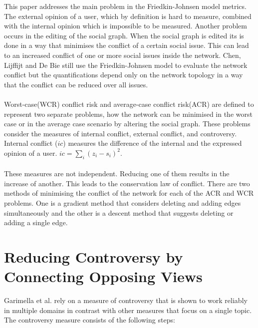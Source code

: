 This paper addresses the main problem in the Friedkin-Johnsen model metrics. The external opinion of a user, which by definition is hard to measure, combined with the internal opinion which is impossible to be measured. Another problem occurs in the editing of the social graph. When the social graph is edited its is done in a way that minimises the conflict of a certain social issue. This can lead to an increased conflict of one or more social issues inside the network. Chen, Lijffijt and De Bie still use the Friedkin-Johnsen model to evaluate the network conflict but the quantifications depend only on the network topology in a way that the conflict can be reduced over all issues. 
\\
\\
Worst-case(WCR) conflict risk and average-case conflict risk(ACR) are defined to represent two separate problems, how the network can be minimised in the worst case or in the average case scenario by altering the social graph. These problems consider the measures of internal conflict, external conflict, and controversy. Internal conflict ($ic$) measures the difference of the internal and the expressed opinion of a user. $ic = \sum_i{(z_i-s_i)^2}.$
 \\
 \\
\noindent These measures are not independent. Reducing one of them results in the increase of another. This leads to the conservation law of conflict. There are two methods of minimising the conflict of the network for each of the ACR and WCR problems. One is a gradient method that  considers deleting and adding edges simultaneously and the other is a descent method that suggests deleting or adding a single edge. \cite{chen}

\section{Reducing Controversy by Connecting Opposing Views}
\label{sec:reducing}

Garimella et al. rely on a measure of controversy that is shown to work reliably in multiple domains in contrast with other measures that focus on a single topic. The controversy measure consists of the following steps:

